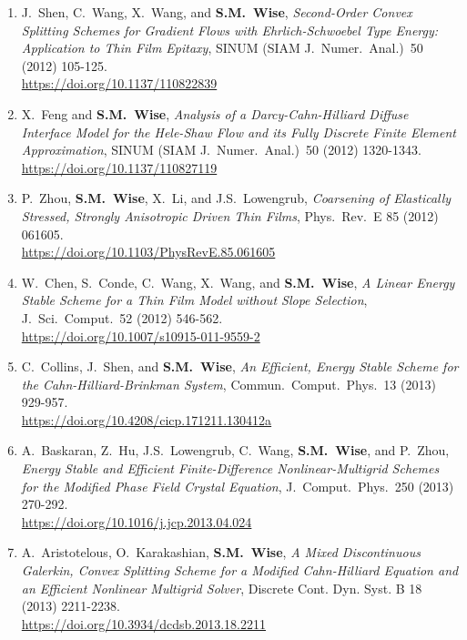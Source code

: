 \documentclass[11pt]{letter}
\begin{document}
\begin{enumerate}
	\item
J.~Shen, C.~Wang, X.~Wang, and \textbf{S.M.~Wise}, {\sl Second-Order Convex Splitting Schemes for Gradient Flows with Ehrlich-Schwoebel Type Energy: Application to Thin Film Epitaxy}, SINUM (SIAM J.~Numer.~Anal.)~50 (2012) 105-125.
	\\
\url{https://doi.org/10.1137/110822839}
    
    \item
X.~Feng and \textbf{S.M.~Wise}, {\sl Analysis of a Darcy-Cahn-Hilliard Diffuse Interface Model for the Hele-Shaw Flow and its Fully Discrete Finite Element Approximation}, SINUM (SIAM J.~Numer.~Anal.)~50 (2012) 1320-1343.
	\\
\url{https://doi.org/10.1137/110827119}

    \item
P.~Zhou, \textbf{S.M.~Wise}, X.~Li, and J.S.~Lowengrub, {\sl Coarsening of Elastically Stressed, Strongly Anisotropic Driven Thin Films}, Phys.~Rev.~E 85 (2012) 061605.
	\\
\url{https://doi.org/10.1103/PhysRevE.85.061605}

	\item
W.~Chen, S.~Conde, C.~Wang, X.~Wang, and \textbf{S.M.~Wise}, {\sl A Linear Energy Stable Scheme for a Thin Film Model without Slope Selection}, J.~Sci.~Comput.~52 (2012) 546-562.
	\\
\url{https://doi.org/10.1007/s10915-011-9559-2}

    \item
C.~Collins, J.~Shen, and \textbf{S.M.~Wise}, {\sl An Efficient, Energy Stable Scheme for the Cahn-Hilliard-Brinkman System}, Commun.~Comput.~Phys.~13 (2013) 929-957.
	\\
\url{https://doi.org/10.4208/cicp.171211.130412a}

    \item
A.~Baskaran, Z.~Hu, J.S.~Lowengrub, C.~Wang, \textbf{S.M.~Wise}, and P.~Zhou, {\sl Energy Stable and Efficient Finite-Difference Nonlinear-Multigrid Schemes for the Modified Phase Field Crystal Equation}, J.~Comput.~Phys.~250 (2013) 270-292.
	\\
\url{https://doi.org/10.1016/j.jcp.2013.04.024}

	\item
A.~Aristotelous, O.~Karakashian, \textbf{S.M.~Wise}, {\sl A Mixed Discontinuous Galerkin, Convex Splitting Scheme for a Modified Cahn-Hilliard Equation and an Efficient Nonlinear Multigrid Solver}, Discrete Cont. Dyn. Syst. B 18 (2013) 2211-2238.
	\\
\url{https://doi.org/10.3934/dcdsb.2013.18.2211}


\end{enumerate}
\end{document}
